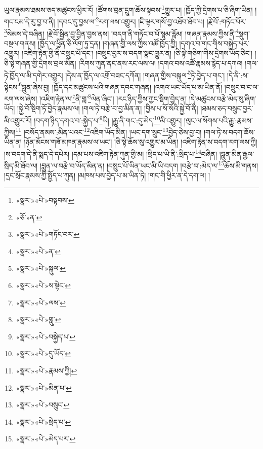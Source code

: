 ཡུལ་རྣམས་ཐམས་ཅད་མཚུངས་ཕྱིར་རོ། །ཚོགས་བྲན་དྲུག་ཆོས་སྟབས་\footnote{«སྣར་»«པེ་»བསྟབས་}གྱུར་པ། །ཁྱོད་ཀྱི་དྲེགས་པ་ཅི་ཞིག་ཡིན། །གང་ངམ་དེ་རུ་བྱ་བ་ནི། །དབང་དུ་བྱས་ལ་\footnote{«ཅོ་»ན་}རག་ལས་འགྱུར། །ཇི་ལྟར་གསོ་བྱ་འཐོབ་ཐོབ་པ། །རྗེ་བོ་:གཏོང་པོར་\footnote{«སྣར་»«པེ་»གཏོང་བར་}སེམས་དེ་བཞིན། །རྗེ་བོ་སྦྱིན་བྱ་བྱིན་བྱས་ནས། །བདག་ནི་གཏོང་བ་པོ་སྙམ་རློམ། །གཞན་རྣམས་ཀྱིས་ནི་\footnote{«སྣར་»«པེ་»ན་}སྡུག་བསྔལ་གནས། །ཁྱོད་ལ་ཕྱིན་ཅི་ལོག་ཏུ་དྲན། །གཞན་གྱི་ལས་ཀྱིས་འཚོ་ཁྱོད་ཀྱི། །དགའ་བ་གང་གིས་བསྐྱེད་པར་འགྱུར། །འཇིག་རྟེན་གྱི་ནི་བསྲུང་པོ་དང་། །བསྲུང་བྱར་ས་བདག་སྣང་གྱུར་ན། །ཅི་སྟེ་གཅིག་གིས་དྲེགས་ཡོད་ཅིང་། །ཅི་སྟེ་གཞན་གྱི་དྲེགས་བྲལ་མིན། །རིགས་ཀུན་ནང་ནས་རང་ལས་ལ། །དགའ་བས་འཚོ་རྣམས་རྙེད་པ་དཀའ། །གལ་ཏེ་ཁྱོད་ལ་མི་དགེར་འགྱུར། །དེས་ན་ཁྱོད་ལ་འགྲོ་བཟང་དཀོན། །གཞན་གྱིས་བསྐུལ་\footnote{«སྣར་»«པེ་»སྐུལ་}ཏེ་བྱེད་པ་གང་། །དེ་ནི་:ས་སྟེངས་\footnote{«སྣར་»«པེ་»ས་སྟེང་}བླུན་ཞེས་བྱ། །ཁྱོད་དང་མཚུངས་པའི་གཞན་དབང་གཞན། །འགའ་ཡང་ཡོད་པ་མ་ཡིན་ནོ། །བསྲུང་བ་ང་ལ་རག་ལས་ཞེས། །འཇིག་རྟེན་ལ་\footnote{«སྣར་»«པེ་»ལས་}ནི་གླ་\footnote{«སྣར་»«པེ་»གླུ་}ལེན་ཞིང་། །རང་ཉིད་ཀྱིས་ཀྱང་སྡིག་བྱེད་ན། །དེ་མཚུངས་བརྩེ་མེད་སུ་ཞིག་ཡོད། །སྐྱེ་བོ་སྡིག་ཏོ་བྱེད་རྣམས་ལ། །གལ་ཏེ་བརྩེ་བ་བྱ་མིན་ན། །བྱིས་པ་སོ་སོའི་སྐྱེ་བོ་ནི། །ཐམས་ཅད་བསྲུང་བྱར་མི་འགྱུར་རོ། །བདག་ཉིད་དགའ་བ་:སྐྱེད་པ་\footnote{«སྣར་»«པེ་»བསྐྱེད་པ་}ཡི། །རྒྱུ་ནི་གང་:དུ་མེད་\footnote{«སྣར་»«པེ་»དུ་ཡོད་}མི་འགྱུར། །ལུང་ལ་སོགས་པའི་རྒྱུ་:རྣམས་ཀྱིས།\footnote{«སྣར་»«པེ་»རྣམས་ཀྱི།} །བསོད་ནམས་:མིན་པའང་\footnote{«སྣར་»«པེ་»མིན་པ་}འཇིག་ཡོད་མིན། །ཡང་དག་སྲུང་\footnote{«སྣར་»«པེ་»བསྲུང་}བྱེད་ཅེས་བྱ་བ། །གལ་ཏེ་ས་བདག་ཆོས་ཡིན་ན། །ཉོན་མོངས་གཟོ་མཁན་རྣམས་ལ་ཡང་། །ཅི་སྟེ་ཆོས་སུ་འགྱུར་མ་ཡིན། །འཇིག་རྟེན་ས་བདག་རག་ལས་ཀྱི། །ས་བདག་དེ་ནི་སྨད་དེ་དཔེར། །དམ་པས་འཇིག་རྟེན་ཀུན་གྱི་མ། །སྲིད་པ་ཡི་ནི་:སྲིད་པ་\footnote{«སྣར་»«པེ་»སྲེད་པ་}བཞིན། །བླུན་མིན་རྒྱལ་སྲིད་མི་ཐོབ་ལ། །བླུན་ལ་བརྩེ་བ་ཡོད་མིན་ན། །བསྲུང་པོ་ཡིན་ཡང་མི་ཡི་བདག །བརྩེ་བ་:མེད་ལ་\footnote{«སྣར་»«པེ་»མེད་པར་}ཆོས་མི་གནས། །དྲང་སྲོང་རྣམས་ཀྱི་སྤྱོད་པ་ཀུན། །མཁས་པས་བྱེད་པ་མ་ཡིན་ཏེ། །གང་གི་ཕྱིར་ན་དེ་དག་ལ། །

